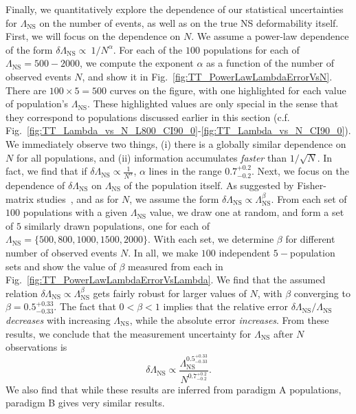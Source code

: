 \documentclass[aps,prd,amsmath,floats,floatfix, twocolumn,
superscriptaddress,nofootinbib,showpacs]{revtex4-1}
\newcommand{\lambdans}{\Lambda_\mathrm{NS}}
\begin{document}
Finally, we quantitatively explore the dependence of our statistical
uncertainties for $\lambdans$ on the number of events, as well as on the true
NS deformability itself. First, we will focus on the dependence on $N$. We
assume a power-law dependence of the form
$\delta\lambdans\propto\ 1/N^\alpha$. For each of the $100$ populations 
for each of $\lambdans=500-2000$, we compute the exponent $\alpha$ as a
function of the number of observed events $N$, and show it in 
Fig.~\ref{fig:TT_PowerLawLambdaErrorVsN}. There are $100\times5=500$ curves
on the figure, with one highlighted for each value of population's $\lambdans$.
These highlighted values are only special in the sense that they correspond to
populations discussed earlier in this section (c.f.
Fig.~\ref{fig:TT_Lambda_vs_N_L800_CI90_0}-\ref{fig:TT_Lambda_vs_N_CI90_0}).
We immediately observe two things, (i) there is a globally similar dependence
on $N$ for all populations, and (ii) information accumulates {\it faster} than
$1/\sqrt{N}$. In fact, we find that if
$\delta\lambdans\propto\frac{1}{N^\alpha}$, $\alpha$ lines in the range
$0.7_{-0.2}^{+0.2}$.
% 
Next, we focus on the dependence of $\delta\lambdans$ on $\lambdans$ of the
population itself. As suggested by Fisher-matrix studies~\cite{Lackey:2013axa},
and as for $N$, we assume the form $\delta\lambdans\propto\lambdans^\beta$.
From each set of $100$ populations with a given $\lambdans$ value, we draw one
at random, and form a set of $5$ similarly drawn populations, one for each of
$\lambdans=\{500,800,1000,1500,2000\}$. With each set, we determine $\beta$
for different number of observed events $N$. In all, we make $100$ independent
$5-$population sets and show the value of $\beta$ measured from each in 
Fig.~\ref{fig:TT_PowerLawLambdaErrorVsLambda}. We find that the assumed
relation $\delta\lambdans\propto\lambdans^\beta$ gets fairly robust for 
larger values of $N$, with $\beta$ converging to $\beta=0.5^{+0.33}_{-0.33}$.
The fact that $0<\beta<1$ implies that the relative error
$\delta\lambdans/\lambdans$ {\it decreases} with increasing $\lambdans$, while
the absolute error {\it increases}.
% 
From these results, we conclude that the measurement uncertainty for
$\lambdans$ after $N$ observations is
\begin{equation}
 \delta\lambdans\propto \dfrac{\lambdans^{0.5^{+0.33}_{-0.33}}}{N^{0.7_{-0.2}^{+0.2}}}.
\end{equation}
We also find that while these results are inferred from paradigm A populations,
paradigm B gives very similar results.
\end{document}
